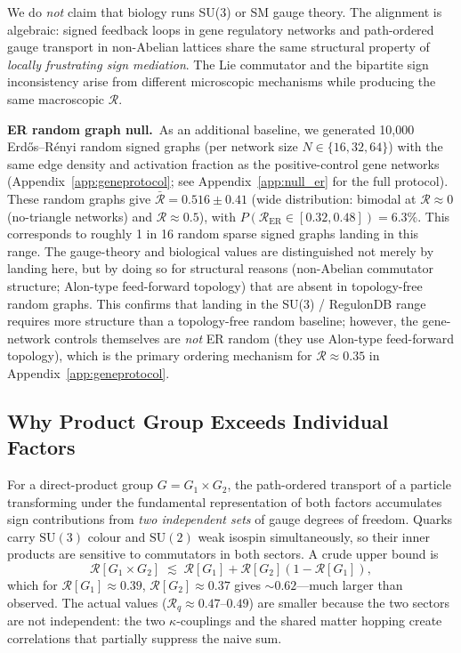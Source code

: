 \documentclass[12pt,a4paper]{article}
\newcommand{\R}{\mathcal{R}}           %
\newcommand{\SU}[1]{\mathrm{SU}(#1)}
\theoremstyle{plain}
\theoremstyle{definition}
\theoremstyle{remark}
\begin{document}
We do \emph{not} claim that biology runs SU(3) or SM gauge theory.
The alignment is algebraic: signed feedback loops in gene regulatory networks
and path-ordered gauge transport in non-Abelian lattices share the same
structural property of \emph{locally frustrating sign mediation}.
The Lie commutator and the bipartite sign inconsistency arise from different
microscopic mechanisms while producing the same macroscopic $\R$.

\medskip
\noindent\textbf{ER random graph null.}~As an additional baseline, we generated
10{,}000 Erd{\H o}s--R{\'e}nyi random signed graphs (per network size
$N\in\{16,32,64\}$) with the same edge density and activation fraction as the
positive-control gene networks (Appendix~\ref{app:geneprotocol}; see
Appendix~\ref{app:null_er} for the full protocol).
These random graphs give $\bar{\R}=0.516\pm0.41$ (wide distribution: bimodal at
$\R\approx0$ (no-triangle networks) and $\R\approx0.5$), with
$P(\R_\text{ER}\in[0.32,0.48])=6.3\%$.
This corresponds to roughly 1 in 16 random sparse signed graphs landing in this range.
The gauge-theory and biological values are distinguished not merely by landing
here, but by doing so for structural reasons (non-Abelian commutator structure;
Alon-type feed-forward topology) that are absent in topology-free random graphs.
This confirms that landing in the SU(3) / RegulonDB range requires more structure than
a topology-free random baseline; however, the gene-network controls themselves are
\emph{not} ER random (they use Alon-type feed-forward topology), which is the primary
ordering mechanism for $\R\approx0.35$ in Appendix~\ref{app:geneprotocol}.

\subsection{Why Product Group Exceeds Individual Factors}

For a direct-product group $G=G_1\times G_2$, the path-ordered transport of a
particle transforming under the fundamental representation of both factors
accumulates sign contributions from \emph{two independent sets} of gauge degrees
of freedom.
Quarks carry $\SU{3}$ colour and $\SU{2}$ weak isospin simultaneously, so their
inner products are sensitive to commutators in both sectors.
A crude upper bound is
\[
  \R[G_1\times G_2] \;\lesssim\; \R[G_1] + \R[G_2](1-\R[G_1]),
\]
which for $\R[G_1]\approx 0.39$, $\R[G_2]\approx 0.37$ gives $\sim 0.62$---much larger
than observed.
The actual values ($\R_q\approx0.47$--$0.49$) are smaller because the two sectors are
not independent: the two $\kappa$-couplings and the shared matter hopping create
correlations that partially suppress the naive sum.
\end{document}
